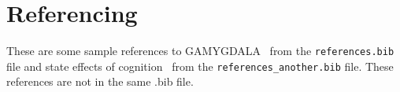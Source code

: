 \section{Referencing}
These are some sample references to GAMYGDALA~\citep{popescu2014gamygdala} from 
the \texttt{references.bib} file and state effects of 
cognition~\citep{hudlicka2002time} from the \texttt{references\_another.bib} 
file. These references are not in the same .bib file.
%
%
%
%
%		
%		
%	
%
%
%
%
%
%
%
